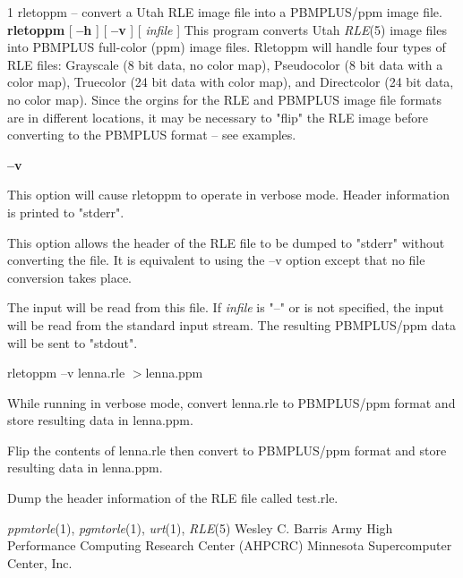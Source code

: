 %
%
%
 1
rletoppm -- convert a Utah RLE image file into a PBMPLUS/ppm image file.
{\bf rletoppm}
[
{\bf --h}
] [
{\bf --v}
] [
{\it infile}
]
This program converts Utah
{\it RLE}{\rm (5)}
image files into PBMPLUS full-color (ppm) image files.  Rletoppm will handle
four types of RLE files: Grayscale (8 bit data, no color map), Pseudocolor
(8 bit data with a color map), Truecolor (24 bit data with color map), and
Directcolor (24 bit data, no color map).  Since the orgins for the RLE and
PBMPLUS image file formats are in different locations, it may be necessary
to "flip" the RLE image before converting to the PBMPLUS format -- see examples.
\begin{TPlist}{{\bf --v}}
\item[{{\bf --v}}]
This option will cause rletoppm to operate in verbose mode.  Header information
is printed to "stderr".
\item[{{\bf --h}}]
This option allows the header of the RLE file to be dumped to "stderr" without
converting the file.  It is equivalent to using the --v option except that no
file conversion takes place.
\item[{{\bf infile}}]
The input will be read from this file.  If
{\it infile}
is "--" or is not specified, the input will be read from the standard
input stream.
The resulting
PBMPLUS/ppm data will be sent to "stdout".
\end{TPlist}
\begin{TPlist}{rletoppm --v lenna.rle $>$lenna.ppm}
\item[{rletoppm --v lenna.rle $>$lenna.ppm}]
While running in verbose mode, convert lenna.rle to PBMPLUS/ppm format and
store resulting data in lenna.ppm.
\item[{rleflip --v lenna.rle $|$ rletoppm $>$lenna.ppm}]
Flip the contents of lenna.rle then convert to PBMPLUS/ppm format and store
resulting data in lenna.ppm.
\item[{rletoppm --h test.rle}]
Dump the header information of the RLE file called test.rle.
\end{TPlist}
{\it ppmtorle}{\rm (1),}
{\it pgmtorle}{\rm (1),}
{\it urt}{\rm (1),}
{\it RLE}{\rm (5)}
\nwl
Wesley C. Barris
\nwl
Army High Performance Computing Research Center (AHPCRC)
\nwl
Minnesota Supercomputer Center, Inc.
\newpage


